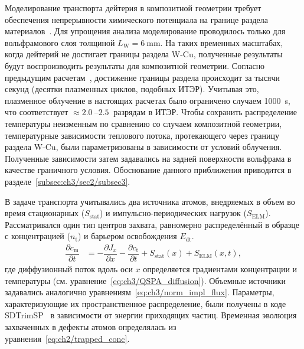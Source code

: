 Моделирование транспорта дейтерия в композитной геометрии требует обеспечения непрерывности химического потенциала на границе раздела материалов~\cite{Delaporte-Mathurin2021_3}. Для упрощения анализа моделирование проводилось только для вольфрамового слоя толщиной \( L_\mathrm{W}=\SI{6}{\milli\meter} \). На таких временных масштабах, когда дейтерий не достигает границы раздела W-Cu, полученные результаты будут воспроизводить результаты для композитной геометрии. Согласно предыдущим расчетам~\cite{Delaporte-Mathurin2019, Delaporte-Mathurin2021_3}, достижение границы раздела происходит за тысячи секунд (десятки плазменных циклов, подобных ИТЭР). Учитывая это, плазменное облучение в настоящих расчетах было ограничено случаем \SI{1000}{\second}, что соответствует \( \approx \SIrange{2.0}{2.5}{} \) разрядам в ИТЭР. Чтобы сохранить распределение температуры неизменным по сравнению со случаем композитной геометрии, температурные зависимости теплового потока, протекающего через границу раздела W-Cu, были параметризованы в зависимости от условий облучения. Полученные зависимости затем задавались на задней поверхности вольфрама в качестве граничного условия. Обоснование данного приближения приводится в разделе~\cref{subsec:ch3/sec2/subsec3}.

В задаче транспорта учитывались два источника атомов, внедряемых в объем во время стационарных (\( S_\mathrm{stat} \)) и импульсно-периодических нагрузок (\( S_\mathrm{ELM} \)). Рассматривался один тип центров захвата, равномерно распределённый в образце с концентрацией (\( n_\mathrm{t} \)) и барьером освобождения \(E_\mathrm{dt} \).
\begin{subequations}
	\label{eq:ch3/diffusion_equation_ITER}
	\begin{align}
		\dfrac{\partial c_{\mathrm{m}}}{\partial t} & =-\dfrac{\partial J_x}{\partial x} - \dfrac{\partial c_{\mathrm{t}}}{\partial t} + S_{\mathrm{stat}}(x)+S_{\mathrm{ELM}}(x,t),
	\end{align}
\end{subequations}
где диффузионный поток вдоль оси \( x \) определяется градиентами концентрации и температуры (см. уравнение~\cref{eq:ch3/QSPA_diffusion}). Объемные источники задавались аналогично уравнениям~\cref{eq:ch3/norm_impl_flux}. Параметры, характеризующие их пространственное распределение, были получены в коде SDTrimSP~\cite{mutzke2024sdtrimsp} в зависимости от энергии приходящих частиц. Временная эволюция захваченных в дефекты атомов определялась из уравнения~\cref{eq:ch2/trapped_conc}. 

